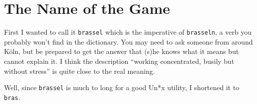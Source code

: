 \documentclass[12pt]{article}
\newcommand{\bras}{\texttt{bras}}
\begin{document}
\section{The Name of the Game}

First I wanted to call it \texttt{brassel} which is the imperative of
\texttt{brasseln}, a verb you probably won't find in the
dictionary. You may need to ask someone from around K\"oln, but be
prepared to get the answer that (s)he knows what it means but cannot
explain it. I think the description "`working concentrated, busily but
without stress"' is quite close to the real meaning.

Well, since \texttt{brassel} is much to long for a good
Un*x utility, I shortened it to \bras.
    
\end{document}
